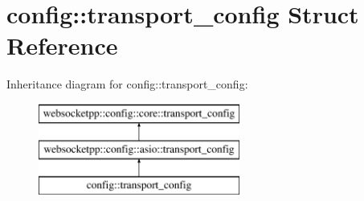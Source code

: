 \hypertarget{structconfig_1_1transport__config}{}\section{config\+:\+:transport\+\_\+config Struct Reference}
\label{structconfig_1_1transport__config}
Inheritance diagram for config\+:\+:transport\+\_\+config\+:\begin{figure}[H]
\begin{center}
\leavevmode
\includegraphics[height=3.000000cm]{structconfig_1_1transport__config}
\end{center}
\end{figure}
